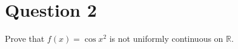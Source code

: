 \documentclass[11pt]{article} %
\begin{document}
%
% 

\section{Question 2}
Prove that $f(x) = \cos{x^2}$ is not uniformly continuous on $\mathbb{R}$.
\end{document}
